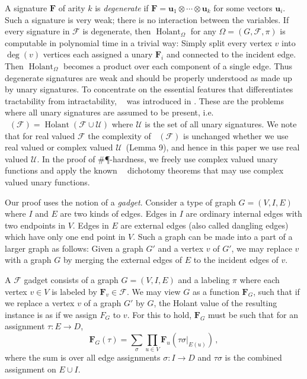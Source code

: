 \documentclass[11pt]{article}
\DeclareMathOperator{\hol}{Holant}
\DeclareMathOperator{\hols}{Holant^*}
\begin{document}
A signature $\mathbf{F}$ of arity $k$ is \textit{degenerate} if $\mathbf{F} = \mathbf{u}_1 \otimes \cdots \otimes \mathbf{u}_k$ for some vectors $\mathbf{u}_i$.
Such a signature is very weak; there is no interaction between the variables.
If every signature in $\mathcal{F}$ is degenerate, then $\hol_\Omega$ for any $\Omega = (G, \mathcal{F}, \pi)$ is computable in polynomial time in a trivial way:
Simply split every vertex $v$ into $\deg(v)$ vertices each assigned a unary $\mathbf{F}_i$ and connected to the incident edge.
Then $\hol_{\Omega}$ becomes a product over each component of a single edge.
Thus degenerate signatures are weak and should be properly understood as made up by unary signatures.
To concentrate on the essential features that differentiates tractability from intractability, $\hols$ was introduced in \cite{10.1145/1536414.1536511, cai_computational_2011}.
These are the problems where all unary signatures are assumed to be present, i.e. $\hols(\mathcal{F}) = \hol(\mathcal{F} \cup \mathcal{U})$ where $\mathcal{U}$ is the set of all unary signatures.
We note that for real valued $\mathcal{F}$ the complexity of $\hols(\mathcal{F})$
 is  unchanged whether we use real valued or complex valued 
 $\mathcal{U}$~\cite{liu_restricted_nodate}(Lemma 9), and
 hence in this paper we use real valued $\mathcal{U}$.
 In the proof of \#\P-hardness, we freely use complex valued unary functions and apply the known $\hols$ dichotomy theorems that may use complex valued unary functions.

Our proof uses the  notion of a \textit{gadget}.
Consider a type of graph $G = (V, I, E)$ where $I$ and $E$ are two kinds of edges.
Edges in $I$ are ordinary internal edges with two endpoints in $V$.
Edges in $E$ are external edges (also called dangling edges) which have only one end point in $V$.
Such a graph can be made into a part of a larger graph as follows: 
Given a graph $G'$ and a vertex $v$ of $G'$, we may replace $v$ with a graph $G$ by merging the external edges of $E$ to the incident edges of $v$.

A $\mathcal{F}$ gadget consists of a graph $G = (V, I, E)$ and a labeling $\pi$ where each vertex $v \in V$ is labeled by $\mathbf{F}_v \in \mathcal{F}$.
We may view $G$ as a function $\mathbf{F}_G$, such that if we replace a vertex $v$ of a graph $G'$ by $G$, the Holant value of the resulting instance is 
as if we assign $F_G$ to $v$.
For this to hold, $\mathbf{F}_G$ must be such that for an assignment $\tau: E \to D$, 
\[
  \mathbf{F}_G(\tau) = \sum_{\sigma}\prod_{u \in V} \mathbf{F}_u (\tau \sigma |_{E(u)}) \, ,
\]
where the sum is over all edge assignments $\sigma: I \to D$ and $\tau \sigma$ is the combined assignment on $E \cup I$.
\end{document}
